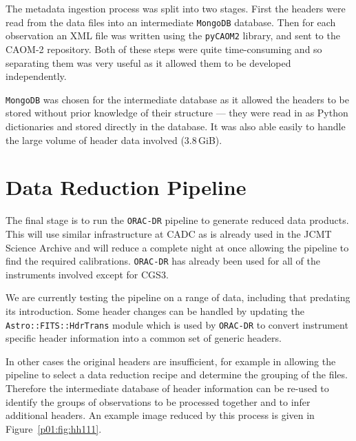 \documentclass[11pt,twoside]{article}
\begin{document}
The metadata ingestion process was split into two stages.
First the headers were
read from the data files into an intermediate
\texttt{MongoDB} database.
Then for each observation an XML file was written
using the \texttt{pyCAOM2} library,
and sent to the CAOM-2 repository.
Both of these steps were quite time-consuming
and so separating them was very useful
as it allowed them to be developed
independently.

\texttt{MongoDB} was chosen for the intermediate database
as it allowed the
headers to be stored without prior knowledge of their structure
--- they were read in as Python dictionaries and
stored directly in the database.
It was also able easily to handle the large
volume of header data involved (3.8\,GiB).

\section{Data Reduction Pipeline}

The final stage is to run the \texttt{ORAC-DR} pipeline
\citep{1999ASPC..172...11E,2008AN....329..295C}
to generate reduced
data products.
This will use similar infrastructure at CADC as is already
used in the JCMT Science Archive
\citep{2011ASPC..442..203E}
and will reduce a complete night at once allowing
the pipeline to find the required calibrations.
\texttt{ORAC-DR} has already been used for all of the instruments
involved except for CGS3.

We are currently testing the pipeline on a range of data,
including that predating its introduction.
Some header changes can be handled by updating the
\texttt{Astro::\-FITS::\-HdrTrans} module
\citep[section 2.2]{2008AN....329..295C}
which is used by \texttt{ORAC-DR} to convert
instrument specific header information into
a common set of generic headers.

In other cases the original headers are insufficient,
for example in allowing the pipeline to
select a data reduction recipe and determine the
grouping of the files.
Therefore the intermediate database of header information
can be re-used to identify
the groups of observations to be processed together and to infer
additional headers.
An example image reduced by this process is given in
Figure~\ref{p01:fig:hh111}.

\end{document}
